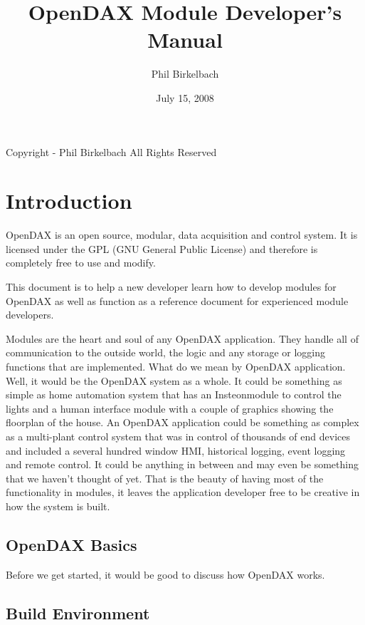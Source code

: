 \documentclass[letterpaper,10pt]{report}
\title{OpenDAX Module Developer's Manual}
\date{July 15, 2008}
\author{Phil Birkelbach}
\begin{document}
\begin{titlepage}
\maketitle

\begin{flushleft}
Copyright  - Phil Birkelbach\linebreak
All Rights Reserved
\end{flushleft}

\end{titlepage}
\chapter*{Introduction}
OpenDAX is an open source, modular, data acquisition and control system. It is licensed under the GPL (GNU General Public License) and therefore is completely free to use and modify.

This document is to help a new developer learn how to develop modules for OpenDAX as well as function as a reference document for experienced module developers.

Modules are the heart and soul of any OpenDAX application.  They handle all of communication to the outside world, the logic and any storage or logging functions that are implemented.  What do we mean by OpenDAX application.  Well, it would be the OpenDAX system as a whole.  It could be something as simple as home automation system that has an Insteon\textregistered module to control the lights and a human interface module with a couple of graphics showing the floorplan of the house.  An OpenDAX application could be something as complex as a multi-plant control system that was in control of thousands of end devices and included a several hundred window HMI, historical logging, event logging and remote control.  It could be anything in between and may even be something that we haven't thought of yet.  That is the beauty of having most of the functionality in modules, it leaves the application developer free to be creative in how the system is built.

\section*{OpenDAX Basics}
Before we get started, it would be good to discuss how OpenDAX works.

\section*{Build Environment}
\end{document}
